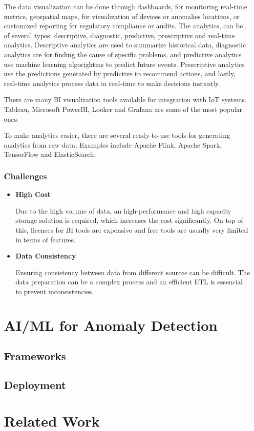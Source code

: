 The data visualization can be done through dashboards, for monitoring real-time
metrics, geospatial maps, for visualization of devices or anomalies locations,
or customized reporting for regulatory compliance or audits. The analytics, can
be of several types: descriptive, diagnostic, predictive, prescriptive and
real-time analytics. Descriptive analytics are used to summarize historical
data, diagnostic analytics are for finding the cause of specific problems, and
predictive analytics use machine learning algorightms to predict future events.
Prescriptive analytics use the predictions generated by predictive to recommend
actions, and lastly, real-time analytics process data in real-time to make
decisions instantly.

There are many \gls{BI} visualization tools available for integration with IoT systems.
Tableau, Microsoft PowerBI, Looker and Grafana are some of the most popular ones.

To make analytics easier, there are several ready-to-use tools for generating
analytics from raw data. Examples include Apache Flink, Apache Spark,
TensorFlow and ElasticSearch.
\subsubsection{Challenges}

\begin{itemize}
	\item \textbf{High Cost}

	      Due to the high volume of data, an high-performance and high capacity storage
	      solution is required, which increases the cost significantly. On top of this,
	      licences for \gls{BI} tools are expensive and free tools are usually very
	      limited in terms of features.

	\item \textbf{Data Consistency}

	      Ensuring consistency between data from different sources can be difficult.
	      The data preparation can be a complex process and an efficient \gls{ETL} is
	      essencial to prevent inconsistencies.

\end{itemize}


\section{AI/ML for Anomaly Detection}
\subsection{Frameworks}
\subsection{Deployment}

\section{Related Work}
